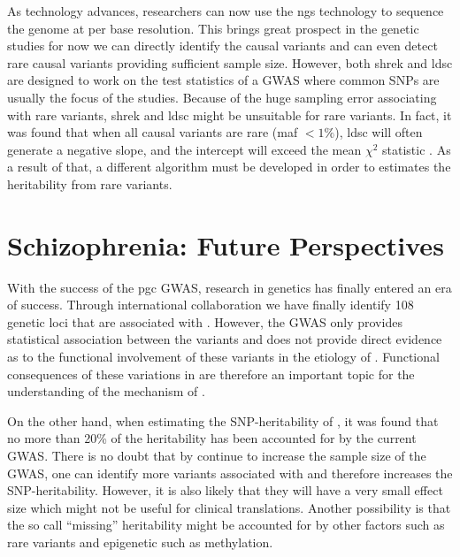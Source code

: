 \documentclass[12pt]{book}
\newcommand*{\glng}{\glsentrylong}
\begin{document}
	As technology advances, researchers can now use the \gls{ngs} technology to sequence the genome at per base resolution. 
	This brings great prospect in the genetic studies for now we can directly identify the causal variants and can even detect rare causal variants providing sufficient sample size. 
	However, both \gls{shrek} and \gls{ldsc} are designed to work on the test statistics of a \gls{GWAS} where common \glspl{SNP} are usually the focus of the studies. 
	Because of the huge sampling error associating with rare variants, \gls{shrek} and \gls{ldsc} might be unsuitable for rare variants. 
	In fact, it was found that when all causal variants are rare (\gls{maf} $<1\%$), \gls{ldsc} will often generate a negative slope, and the intercept will exceed the mean $\chi^2$ statistic \citep{Bulik-Sullivan2015}.
	As a result of that, a different algorithm must be developed in order to estimates the heritability from rare variants.
	
	\section{Schizophrenia: Future Perspectives}
	With the success of the \gls{pgc} \glng{scz} \gls{GWAS}, research in \glng{scz} genetics has finally entered an era of success.
	Through international collaboration we have finally identify 108 genetic loci that are associated with \glng{scz} \citep{Ripke2013}.
	However, the \gls{GWAS} only provides statistical association between the variants \glng{scz} and does not provide direct evidence as to the functional involvement of these variants in the etiology of \glng{scz}.
	Functional consequences of these variations in \glng{scz} are therefore an important topic for the understanding of the mechanism of \glng{scz}.
	
	On the other hand, when estimating the \gls{SNP}-heritability of \glng{scz}, it was found that no more than 20\% of the heritability has been accounted for by the current \gls{GWAS}.
	There is no doubt that by continue to increase the sample size of the \gls{GWAS}, one can identify more variants associated with \glng{scz} and therefore increases the \gls{SNP}-heritability. 
	However, it is also likely that they will have a very small effect size which might not be useful for clinical translations.
	Another possibility is that the so call ``missing'' heritability might be accounted for by other factors such as rare variants and epigenetic such as methylation.
	
\end{document}
